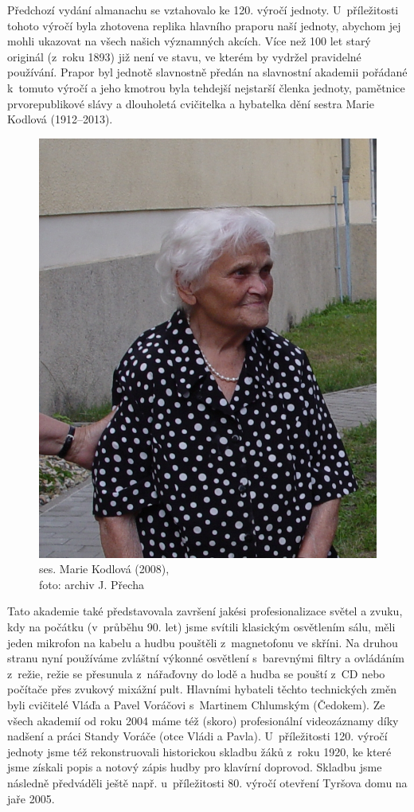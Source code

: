\documentclass[a5paper, 11pt, twoside]{article}
\begin{document}
Předchozí vydání almanachu se vztahovalo ke 120. výročí jednoty. U~příležitosti tohoto výročí byla zhotovena replika hlavního praporu naší
jednoty, abychom jej mohli ukazovat na všech našich významných akcích.
Více než 100 let starý originál (z~roku 1893) již není ve stavu, ve
kterém by vydržel pravidelné používání. Prapor byl jednotě slavnostně
předán na slavnostní akademii pořádané k~tomuto výročí a jeho kmotrou
byla tehdejší nejstarší členka jednoty, pamětnice prvorepublikové slávy
a dlouholetá cvičitelka a hybatelka dění sestra Marie Kodlová
(1912--2013). 
\begin{figure}
  \includegraphics[width=0.9\linewidth]{img/50_manka.jpg}
  \caption*{ses. Marie Kodlová (2008),\\foto: archiv J. Přecha}
\end{figure}
Tato akademie také představovala završení jakési profesionalizace světel a zvuku, kdy na počátku (v~průběhu 90. let) jsme
svítili klasickým osvětlením sálu, měli jeden mikrofon na kabelu a hudbu
pouštěli z~magnetofonu ve skříni. Na druhou stranu nyní používáme
zvláštní výkonné osvětlení s~barevnými filtry a ovládáním z~režie, režie
se přesunula z~nářaďovny do lodě a hudba se pouští z~CD nebo počítače
přes zvukový mixážní pult. Hlavními hybateli těchto technických změn
byli cvičitelé Vláďa a Pavel Voráčovi s~Martinem Chlumským (Čedokem). Ze
všech akademií od roku 2004 máme též (skoro) profesionální videozáznamy
díky nadšení a práci Standy Voráče (otce Vládi a Pavla). U~příležitosti
120. výročí jednoty jsme též rekonstruovali historickou skladbu žáků
z~roku 1920, ke které jsme získali popis a notový zápis hudby pro klavírní
doprovod. Skladbu jsme následně předváděli ještě např. u~příležitosti
80. výročí otevření Tyršova domu na jaře 2005.
\end{document}
